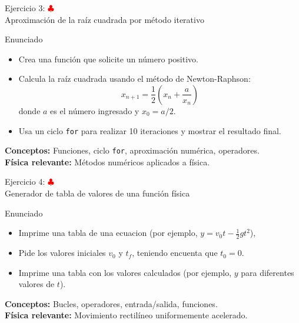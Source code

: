 \documentclass[10pt]{beamer}
\begin{document}
\begin{frame}{Ejercicio 3: \hfill \textcolor{red}{$\clubsuit$} \\ Aproximación de la raíz cuadrada por método iterativo}
  \small
  \begin{block}{Enunciado}
    \begin{itemize}
      \setlength{\itemsep}{0.35em}
      \item Crea una función que solicite un número positivo.
      \item Calcula la raíz cuadrada usando el método de Newton-Raphson:
        \[
        x_{n+1}=\frac{1}{2}\left(x_n+\frac{a}{x_n}\right)
        \]
        donde \(a\) es el número ingresado y \(x_0=a/2\).
      \item Usa un ciclo \texttt{for} para realizar 10 iteraciones y mostrar el resultado final.
    \end{itemize}
  \end{block}
  \textbf{Conceptos:} Funciones, ciclo \texttt{for}, aproximación numérica, operadores.\\
  \textbf{Física relevante:} Métodos numéricos aplicados a física.
\end{frame}
\begin{frame}{Ejercicio 4: \hfill \textcolor{red}{$\clubsuit$} \\ Generador de tabla de valores de una función física}
  \begin{block}{Enunciado}
    \begin{itemize}
      \item Imprime una tabla de una ecuacion (por ejemplo, \(y = v_0 t - \frac{1}{2}gt^2\)),
      \item Pide los valores iniciales \(v_0\) y  \(t_f\), teniendo encuenta que \(t_0 = 0 \).
      \item Imprime una tabla con los valores calculados (por ejemplo, \(y\) para diferentes valores de \(t\)).
    \end{itemize}
  \end{block}
  \textbf{Conceptos:} Bucles, operadores, entrada/salida, funciones.\\
  \textbf{Física relevante:} Movimiento rectilíneo uniformemente acelerado.
\end{frame}
\end{document}
